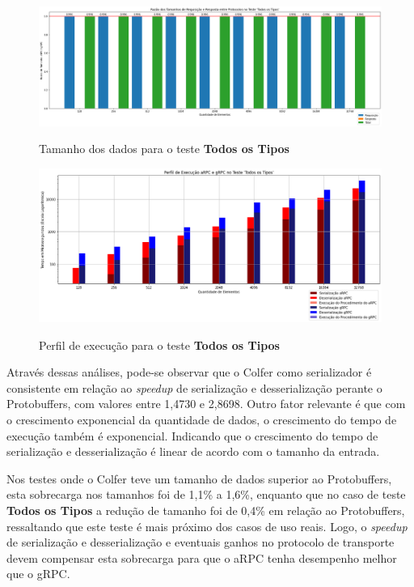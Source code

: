 \begin{figure}[ht]
    \centering
    \caption{Tamanho dos dados para o teste \textbf{Todos os Tipos}}
    \includegraphics[width=\textwidth]{figuras/graficos/serializacao/razao_tamanho_alltypes.png} 
    \label{fig:razao_tamanho_alltypes}
\end{figure}

\begin{figure}[ht]
    \centering
    \caption{Perfil de execução para o teste \textbf{Todos os Tipos}}
    \includegraphics[width=\textwidth]{figuras/graficos/serializacao/perfil_execucao_alltypes.png} 
    \label{fig:perfil_execucao_alltypes}
\end{figure}

Através dessas análises, pode-se observar que o Colfer como serializador é consistente em relação ao \textit{speedup} de serialização e desserialização perante o Protobuffers, com valores entre 1,4730 e 2,8698. Outro fator relevante é que com o crescimento exponencial da quantidade de dados, o crescimento do tempo de execução também é exponencial. Indicando que o crescimento do tempo de serialização e desserialização é linear de acordo com o tamanho da entrada.

Nos testes onde o Colfer teve um tamanho de dados superior ao Protobuffers, esta sobrecarga nos tamanhos foi de 1,1\% a 1,6\%, enquanto que no caso de teste \textbf{Todos os Tipos} a redução de tamanho foi de 0,4\% em relação ao Protobuffers, ressaltando que este teste é mais próximo dos casos de uso reais. Logo, o \textit{speedup} de serialização e desserialização e eventuais ganhos no protocolo de transporte devem compensar esta sobrecarga para que o aRPC tenha desempenho melhor que o gRPC.

